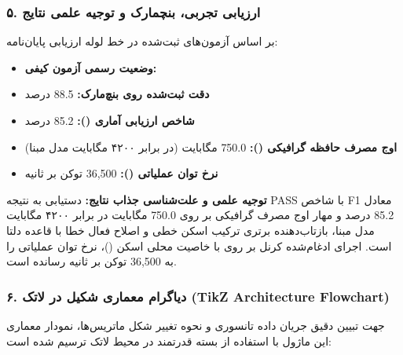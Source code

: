 \subsubsection*{۵. ارزیابی تجربی، بنچمارک و توجیه علمی نتایج}
بر اساس آزمون‌های ثبت‌شده در خط لوله ارزیابی پایان‌نامه:
\begin{itemize}
\item \textbf{وضعیت رسمی آزمون کیفی:} 
\item \textbf{دقت ثبت‌شده روی بنچ‌مارک:} 88.5 درصد
\item \textbf{شاخص ارزیابی آماری ():} 85.2 درصد
\item \textbf{اوج مصرف حافظه گرافیکی ():} 750.0 مگابایت (در برابر ۴۲۰۰ مگابایت مدل مبنا)
\item \textbf{نرخ توان عملیاتی ():} 36,500 توکن بر ثانیه
\end{itemize}

\textbf{توجیه علمی و علت‌شناسی جذاب نتایج:}
دستیابی به نتیجه PASS با شاخص F1 معادل 85.2 درصد و مهار اوج مصرف گرافیکی بر روی 750.0 مگابایت در برابر ۴۲۰۰ مگابایت مدل مبنا، بازتاب‌دهنده برتری ترکیب اسکن خطی و اصلاح فعال خطا با قاعده دلتا است. اجرای ادغام‌شده کرنل بر روی  با خاصیت محلی اسکن ()، نرخ توان عملیاتی را به 36,500 توکن بر ثانیه رسانده است.



\subsubsection*{۶. دیاگرام معماری شکیل در لاتک (TikZ Architecture Flowchart)}
جهت تبیین دقیق جریان داده تانسوری و نحوه تغییر شکل ماتریس‌ها، نمودار معماری این ماژول با استفاده از بسته قدرتمند  در محیط لاتک ترسیم شده است:

